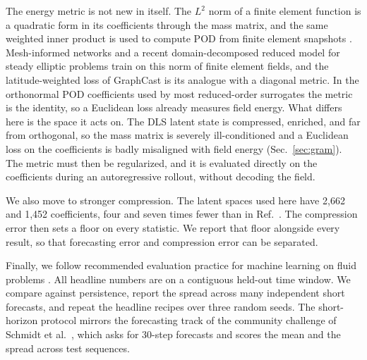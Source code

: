 \documentclass[conf]{new-aiaa}
\begin{document}
The energy metric is not new in itself. The $L^2$ norm of a finite element function is a quadratic form in its coefficients through the mass matrix, and the same weighted inner product is used to compute POD from finite element snapshots \cite{parish2023residual}. Mesh-informed networks \cite{franco2023minn} and a recent domain-decomposed reduced model for steady elliptic problems \cite{dimola2026ddrom} train on this norm of finite element fields, and the latitude-weighted loss of GraphCast \cite{lam2023graphcast} is its analogue with a diagonal metric. In the orthonormal POD coefficients used by most reduced-order surrogates the metric is the identity, so a Euclidean loss already measures field energy. What differs here is the space it acts on. The DLS latent state is compressed, enriched, and far from orthogonal, so the mass matrix is severely ill-conditioned and a Euclidean loss on the coefficients is badly misaligned with field energy (Sec.~\ref{sec:gram}). The metric must then be regularized, and it is evaluated directly on the coefficients during an autoregressive rollout, without decoding the field.

We also move to stronger compression. The latent spaces used here have 2,662 and 1,452 coefficients, four and seven times fewer than in Ref.~\cite{morton2026scitech}. The compression error then sets a floor on every statistic. We report that floor alongside every result, so that forecasting error and compression error can be separated.

Finally, we follow recommended evaluation practice for machine learning on fluid problems \cite{mcgreivy2024weak}. All headline numbers are on a contiguous held-out time window. We compare against persistence, report the spread across many independent short forecasts, and repeat the headline recipes over three random seeds. The short-horizon protocol mirrors the forecasting track of the community challenge of Schmidt et al.~\cite{schmidt2026challenge}, which asks for 30-step forecasts and scores the mean and the spread across test sequences.
\end{document}
